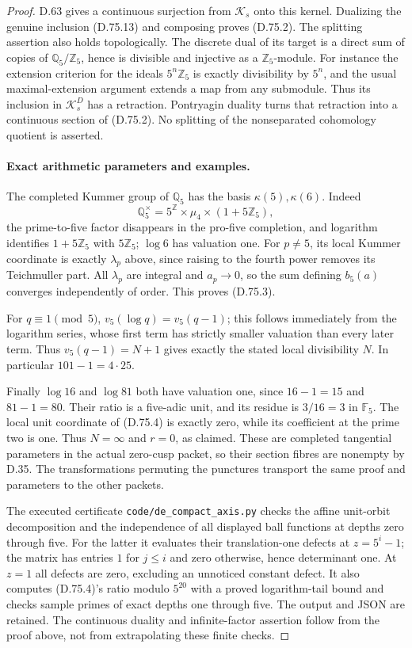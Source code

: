 \begin{proof}
D.63 gives a continuous surjection from \(\mathcal K_s\)
onto this kernel. Dualizing the genuine inclusion (D.75.13)
and composing proves (D.75.2).
The splitting assertion also holds topologically. The discrete
dual of its target is a direct sum of copies of
\(\mathbb Q_5/\mathbb Z_5\), hence is divisible and injective
as a \(\mathbb Z_5\)-module. For instance the extension
criterion for the ideals \(5^n\mathbb Z_5\) is exactly
divisibility by \(5^n\), and the usual maximal-extension
argument extends a map from any submodule. Thus its inclusion
in \(\mathcal K_s^D\) has a retraction. Pontryagin duality
turns that retraction into a continuous section of (D.75.2).
No splitting of the nonseparated cohomology quotient is asserted.

\paragraph{Exact arithmetic parameters and examples.}
The completed Kummer group of \(\mathbb Q_5\) has the basis
\(\kappa(5),\kappa(6)\). Indeed
\[
 \mathbb Q_5^\times=5^{\mathbb Z}\times\mu_4\times(1+5\mathbb Z_5),
 \]
the prime-to-five factor disappears in the pro-five completion,
and logarithm identifies \(1+5\mathbb Z_5\) with \(5\mathbb Z_5\);
\(\log6\) has valuation one. For \(p\ne5\), its local
Kummer coordinate is exactly \(\lambda_p\) above, since
raising to the fourth power removes its Teichmuller part.
All \(\lambda_p\) are integral and \(a_p\to0\), so the
sum defining \(b_5(a)\) converges independently of order.
This proves (D.75.3).

For \(q\equiv1\pmod5\), \(v_5(\log q)=v_5(q-1)\);
this follows immediately from the logarithm series, whose
first term has strictly smaller valuation than every later
term. Thus \(v_5(q-1)=N+1\) gives exactly the stated local
divisibility \(N\). In particular \(101-1=4\cdot25\).

Finally \(\log16\) and \(\log81\) both have valuation one,
since \(16-1=15\) and \(81-1=80\). Their ratio is a
five-adic unit, and its residue is \(3/16=3\) in \(\mathbb F_5\).
The local unit coordinate of (D.75.4) is exactly zero,
while its coefficient at the prime two is one. Thus
\(N=\infty\) and \(r=0\), as claimed.
These are completed tangential parameters in the actual
zero-cusp packet, so their section fibres are nonempty
by D.35. The transformations permuting the punctures
transport the same proof and parameters to the other packets.

The executed certificate \texttt{code/de\_compact\_axis.py}
checks the affine unit-orbit decomposition and the independence
of all displayed ball functions at depths zero through five.
For the latter it evaluates their translation-one defects at
\(z=5^i-1\); the matrix has entries \(1\) for \(j\le i\)
and zero otherwise, hence determinant one. At \(z=1\)
all defects are zero, excluding an unnoticed constant defect.
It also computes (D.75.4)'s ratio modulo \(5^{20}\) with a
proved logarithm-tail bound and checks sample primes of exact
depths one through five. The output and JSON are retained.
The continuous duality and infinite-factor assertion follow
from the proof above, not from extrapolating these finite checks.
\end{proof}
